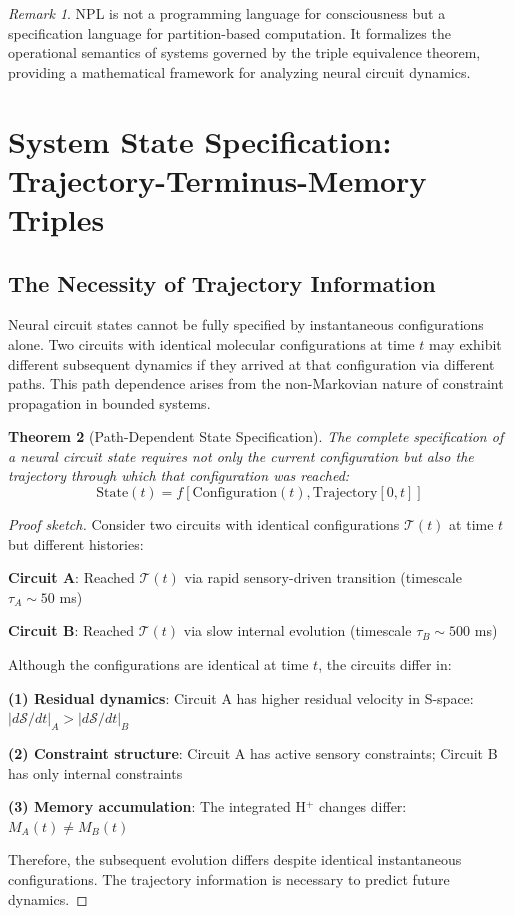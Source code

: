 \documentclass[aps,prd,twocolumn,superscriptaddress,floatfix,nofootinbib]{revtex4-2}
\newtheorem{theorem}{Theorem}[section]
\theoremstyle{remark}
\newtheorem{remark}[theorem]{Remark}
\begin{document}
\begin{remark}
NPL is not a programming language for consciousness but a specification language for partition-based computation. It formalizes the operational semantics of systems governed by the triple equivalence theorem, providing a mathematical framework for analyzing neural circuit dynamics.
\end{remark}

\section{System State Specification: Trajectory-Terminus-Memory Triples}
\label{sec:mental_states}

\subsection{The Necessity of Trajectory Information}

Neural circuit states cannot be fully specified by instantaneous configurations alone. Two circuits with identical molecular configurations at time $t$ may exhibit different subsequent dynamics if they arrived at that configuration via different paths. This path dependence arises from the non-Markovian nature of constraint propagation in bounded systems.

\begin{theorem}[Path-Dependent State Specification]
\label{thm:path_dependence}
The complete specification of a neural circuit state requires not only the current configuration but also the trajectory through which that configuration was reached:
\begin{equation}
\text{State}(t) = f[\text{Configuration}(t), \text{Trajectory}[0,t]]
\end{equation}
\end{theorem}

\begin{proof}[Proof sketch]
Consider two circuits with identical configurations $\mathcal{T}(t)$ at time $t$ but different histories:

\textbf{Circuit A}: Reached $\mathcal{T}(t)$ via rapid sensory-driven transition (timescale $\tau_A \sim 50$ ms)

\textbf{Circuit B}: Reached $\mathcal{T}(t)$ via slow internal evolution (timescale $\tau_B \sim 500$ ms)

Although the configurations are identical at time $t$, the circuits differ in:

\textbf{(1) Residual dynamics}: Circuit A has higher residual velocity in S-space: $|d\mathcal{S}/dt|_A > |d\mathcal{S}/dt|_B$

\textbf{(2) Constraint structure}: Circuit A has active sensory constraints; Circuit B has only internal constraints

\textbf{(3) Memory accumulation}: The integrated H$^+$ changes differ: $M_A(t) \neq M_B(t)$

Therefore, the subsequent evolution differs despite identical instantaneous configurations. The trajectory information is necessary to predict future dynamics.
\end{proof}
\end{document}
